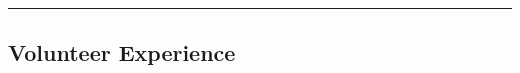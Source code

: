 \documentclass[11pt,a4paper]{article}
\makeatletter
\newcommand{\headerrow}[2]
{\begin{tabular*}{\linewidth}{l@{\extracolsep{\fill}}r}
	#1 &
	#2 \\
\end{tabular*}}
\makeatother
\begin{document}
\begin{itemize}[leftmargin=0em]
\begin{itemize*}
	
	\end{itemize*}
	
		

	
	
	
	
\end{itemize}

\hrule %
\vspace{-0.3em}

\subsection*{Volunteer Experience}

\vspace{-0.2em}
\end{document}
